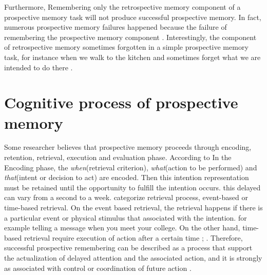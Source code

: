 Furthermore, Remembering only the retrospective memory component of a prospective memory task will not produce successful prospective memory. In fact, numerous prospective memory failures happened because the failure of remembering the prospective memory component
\citep{einsteindGuynn1992}. Interestingly, the component of retrospective memory sometimes forgotten in a simple prospective memory task, for instance when we walk to the kitchen and sometimes forget what we are intended to do there \citep{brandimonte1996prospective}.


\section{Cognitive process of prospective memory}


Some researcher believes that prospective memory proceeds  through encoding, retention, retrieval, execution and evaluation phase.
According to \cite{inside1996prospective} In the Encoding phase, the \textit{when}(retrieval criterion), \textit{what}(action to be performed) and \textit{that}(intent or decision to act) are encoded. Then this intention representation must be retained until the opportunity to fulfill the intention occurs. this delayed can vary from a second to a week. \cite{EinsteinGillesO.1990NAaP} categorize  retrieval process, event-based or time-based retrieval. On the event based retrieval, the retrieval happens if there is a particular event or physical stimulus that associated with the intention. for example telling a message when you meet your college. On the other hand, time-based retrieval require execution of action after a certain time  \citep{inside1996prospective};   \citep{Mcgann2002}.
Therefore, successful prospective remembering can be described as a process that support the actualization of delayed attention and the associated action, and it is strongly as associated with control or coordination of future action \citep{inside1996prospective}.

